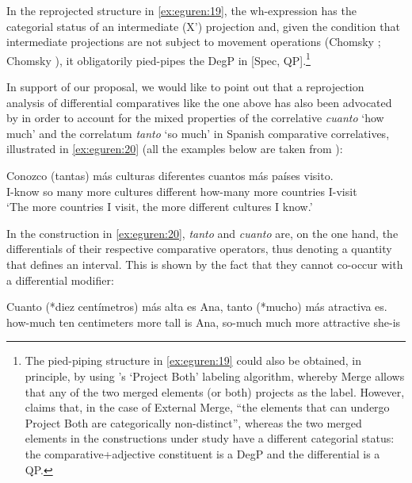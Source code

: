 \documentclass[output=paper,colorlinks,citecolor=brown]{langscibook}
\begin{document}
In the reprojected structure in \ref{ex:eguren:19}, the wh-expression has the categorial status of an intermediate (X') projection and, given the condition that intermediate projections are not subject to movement operations (Chomsky \citeyear[4]{chomsky1986barriers}; Chomsky \citeyear[396]{chomsky1995a}), it obligatorily pied-pipes the DegP in [Spec, QP].\footnote{The pied-piping structure in \ref{ex:eguren:19} could also be obtained, in principle, by using \cite{citko2008missing}'s 
`Project Both' labeling algorithm, whereby Merge allows that any of the two merged elements (or both) projects as the label. However, \cite[926]{citko2008missing} claims that, in the case of External Merge, ``the elements that can undergo Project Both are categorically non-distinct'', whereas the two merged elements in the constructions under study have a different categorial status: the comparative+adjective constituent is a DegP and the differential is a QP.}

In support of our proposal, we would like to point out that a reprojection analysis of differential comparatives like the one above has also been advocated by \cite{lopez2014left} in order to account for the mixed properties of the correlative \textit{cuanto} `how much' and the correlatum \textit{tanto} `so much' in Spanish comparative correlatives, illustrated in \ref{ex:eguren:20} (all the examples below are taken from \cite{lopez2014left}):

\begin{exe} 
    \ex\label{ex:eguren:20} 
\gll Conozco (tantas)	más	culturas	diferentes cuantos	más	países	visito.\\
I-know 	{so many}	more	cultures	different how-many	more	countries I-visit\\
\glt `The more countries I visit, the more different cultures I know.'
\end{exe}

In the construction in \ref{ex:eguren:20}, \textit{tanto} and \textit{cuanto} are, on the one hand, the differentials of their respective comparative operators, thus denoting a quantity that defines an interval. This is shown by the fact that they cannot co-occur with a differential modifier:


\begin{exe} 
    \ex\label{ex:eguren:21} 
\gll	Cuanto		{(*diez	centímetros)}	más	alta	es	Ana, tanto (*mucho)	más	atractiva	es.\\
how-much	  {ten		centimeters} 	more	tall	is	Ana, so-much		much 		more	attractive	she-is\\
\end{exe}
\end{document}
